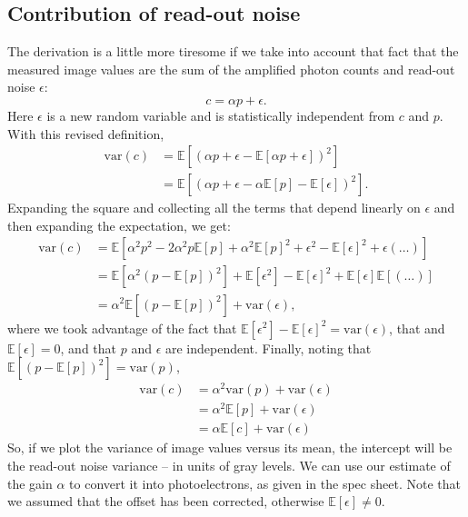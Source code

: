 \documentclass[a4paper]{report}
\begin{document}
\subsection{Contribution of read-out noise}
The derivation is a little more tiresome if we take into account that fact that the measured image values are the sum of the amplified photon counts and read-out noise $\epsilon$:
\begin{equation}
	c = \alpha p + \epsilon.
\end{equation}
Here $\epsilon$ is a new random variable and is statistically independent from $c$ and $p$. With this revised definition, 
\begin{align}
	\mathrm{var}(c) & = \mathbb{E}[(\alpha p + \epsilon - \mathbb{E}[\alpha p + \epsilon ])^2] \\
	& = \mathbb{E}[(\alpha p + \epsilon - \alpha \mathbb{E}[p] - \mathbb{E}[\epsilon])^2].
\end{align}
Expanding the square and collecting all the terms that depend linearly on $\epsilon$ and then expanding the expectation, we get:
\begin{align}
	\mathrm{var}(c) & = \mathbb{E}[\alpha^2 p^2 - 2\alpha^2 p\mathbb{E}[p] +\alpha^2\mathbb{E}[p]^2 + \epsilon^2 - \mathbb{E}[\epsilon]^2 + \epsilon(\ldots)]\\
	& =  \mathbb{E}[\alpha^2(p - \mathbb{E}[p])^2] + \mathbb{E}[\epsilon^2] - \mathbb{E}[\epsilon]^2 + \mathbb{E}[\epsilon]\mathbb{E}[(\ldots)] \\
	& = \alpha^2 \mathbb{E}[(p - \mathbb{E}[p])^2] + \mathrm{var}(\epsilon),
\end{align}
where we took advantage of the fact that $\mathbb{E}[\epsilon^2] - \mathbb{E}[\epsilon]^2 = \mathrm{var}(\epsilon)$, that and $\mathbb{E}[\epsilon]=0$, and that $p$ and $\epsilon$ are independent. Finally, noting that $\mathbb{E}[(p - \mathbb{E}[p])^2] = \mathrm{var}(p)$,
\begin{align}
	\mathrm{var}(c) & = \alpha^2 \mathrm{var}(p) + \mathrm{var}(\epsilon) \\
	& = \alpha^2 \mathbb{E}[p] + \mathrm{var}(\epsilon) \\
	& = \alpha\mathbb{E}[c] + \mathrm{var}(\epsilon)
\end{align}
So, if we plot the variance of image values versus its mean, the intercept will be the read-out noise variance -- in units of gray levels. We can use our estimate of the gain $\alpha$ to convert it into photoelectrons, as given in the spec sheet. Note that we assumed that the offset has been corrected, otherwise $\mathbb{E}[\epsilon] \neq 0$.
\end{document}
